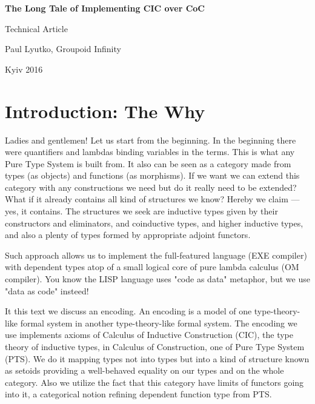 \documentclass[11pt,oneside]{article}
\begin{document}
\thispagestyle{empty}
\begin{center}
\vspace{3cm}
    \vspace{3cm}   {\Large \bf The Long Tale of Implementing CIC over CoC\\}\par
    \vspace{0.3cm} {\Large Technical Article\par}
    \vspace{0.3cm} {\Large Paul Lyutko, Groupoid Infinity\par}
    \vspace{4cm}   {\Large Kyiv 2016}
\end{center}

\newpage
\vspace{2cm}
\tableofcontents

\newpage
\section{Introduction: The Why}

Ladies and gentlemen! Let us start from the beginning. In the beginning there were quantifiers and lambdas binding variables in the terms. This is what any Pure Type System is built from. It also can be seen as a category made from types (as objects) and functions (as morphisms). If we want we can extend this category with any constructions we need but do it really need to be extended? What if it already contains all kind of structures we know? Hereby we claim --- yes, it contains. The structures we seek are inductive types given by their constructors and eliminators, and coinductive types, and higher inductive types, and also a plenty of types formed by appropriate adjoint functors.



Such approach allows us to implement the full-featured language (EXE compiler) with dependent types atop of a small logical core of pure lambda calculus (OM compiler). You know the LISP language uses "code as data" metaphor, but we use "data as code" insteed!



It this text we discuss an encoding. An encoding is a model of one type-theory-like formal system in another type-theory-like formal system. The encoding we use implements axioms of Calculus of Inductive Construction (CIC), the type theory of inductive types, in Calculus of Construction, one of Pure Type System (PTS). We do it mapping types not into types but into a kind of structure known as setoids providing a well-behaved equality on our types and on the whole category. Also we utilize the fact that this category have limits of functors going into it, a categorical notion refining dependent function type from PTS.
\end{document}
